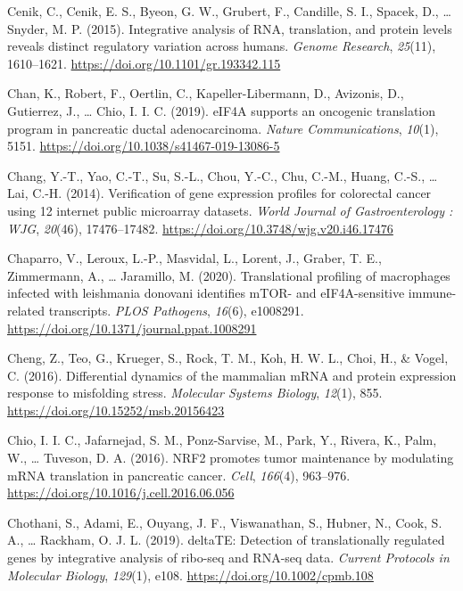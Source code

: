\documentclass[12pt,openany]{book}
\begin{document}
\hypertarget{ref-Cenik2015}{}
Cenik, C., Cenik, E. S., Byeon, G. W., Grubert, F., Candille, S. I.,
Spacek, D., \ldots{} Snyder, M. P. (2015). Integrative analysis of RNA,
translation, and protein levels reveals distinct regulatory variation
across humans. \emph{Genome Research}, \emph{25}(11), 1610--1621.
\url{https://doi.org/10.1101/gr.193342.115}

\hypertarget{ref-Chan2019}{}
Chan, K., Robert, F., Oertlin, C., Kapeller-Libermann, D., Avizonis, D.,
Gutierrez, J., \ldots{} Chio, I. I. C. (2019). eIF4A supports an
oncogenic translation program in pancreatic ductal adenocarcinoma.
\emph{Nature Communications}, \emph{10}(1), 5151.
\url{https://doi.org/10.1038/s41467-019-13086-5}

\hypertarget{ref-Chang2014}{}
Chang, Y.-T., Yao, C.-T., Su, S.-L., Chou, Y.-C., Chu, C.-M., Huang,
C.-S., \ldots{} Lai, C.-H. (2014). Verification of gene expression
profiles for colorectal cancer using 12 internet public microarray
datasets. \emph{World Journal of Gastroenterology : WJG}, \emph{20}(46),
17476--17482. \url{https://doi.org/10.3748/wjg.v20.i46.17476}

\hypertarget{ref-Chaparro2020}{}
Chaparro, V., Leroux, L.-P., Masvidal, L., Lorent, J., Graber, T. E.,
Zimmermann, A., \ldots{} Jaramillo, M. (2020). Translational profiling
of macrophages infected with leishmania donovani identifies mTOR- and
eIF4A-sensitive immune-related transcripts. \emph{PLOS Pathogens},
\emph{16}(6), e1008291.
\url{https://doi.org/10.1371/journal.ppat.1008291}

\hypertarget{ref-Cheng2016}{}
Cheng, Z., Teo, G., Krueger, S., Rock, T. M., Koh, H. W. L., Choi, H.,
\& Vogel, C. (2016). Differential dynamics of the mammalian mRNA and
protein expression response to misfolding stress. \emph{Molecular
Systems Biology}, \emph{12}(1), 855.
\url{https://doi.org/10.15252/msb.20156423}

\hypertarget{ref-Chio2016}{}
Chio, I. I. C., Jafarnejad, S. M., Ponz-Sarvise, M., Park, Y., Rivera,
K., Palm, W., \ldots{} Tuveson, D. A. (2016). NRF2 promotes tumor
maintenance by modulating mRNA translation in pancreatic cancer.
\emph{Cell}, \emph{166}(4), 963--976.
\url{https://doi.org/10.1016/j.cell.2016.06.056}

\hypertarget{ref-Chothani2019}{}
Chothani, S., Adami, E., Ouyang, J. F., Viswanathan, S., Hubner, N.,
Cook, S. A., \ldots{} Rackham, O. J. L. (2019). deltaTE: Detection of
translationally regulated genes by integrative analysis of ribo-seq and
RNA-seq data. \emph{Current Protocols in Molecular Biology},
\emph{129}(1), e108. \url{https://doi.org/10.1002/cpmb.108}
\end{document}
